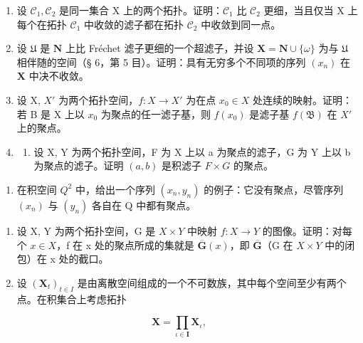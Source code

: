 \BourbakiExerciseGroup

\begin{enumerate}
\def\labelenumi{\arabic{enumi})}
\item
  设 \(\mathcal{C}_1, \mathcal{C}_2\) 是同一集合 X 上的两个拓扑。证明：\(\mathcal{C}_1\) 比 \(\mathcal{C}_2\) 更细，当且仅当 X 上每个在拓扑 \(\mathcal{C}_1\) 中收敛的滤子都在拓扑 \(\mathcal{C}_2\) 中收敛到同一点。
\item
  设 \(\mathfrak{U}\) 是 \(\mathbf{N}\) 上比 Fréchet 滤子更细的一个超滤子，并设 \(\mathbf{X} = \mathbf{N} \cup \{\omega\}\) 为与 \(\mathfrak{U}\) 相伴随的空间（§ 6，第 5 目）。证明：具有无穷多个不同项的序列 \((x_n)\) 在 \(\mathbf{X}\) 中决不收敛。
\item
  设 X, \(X'\) 为两个拓扑空间，\(f: X \to X'\) 为在点 \(x_{0} \in X\) 处连续的映射。证明：若 B 是 X 上以 \(x_{0}\) 为聚点的任一滤子基，则 \(f(x_{0})\) 是滤子基 \(f(\mathfrak{B})\) 在 \(X'\) 上的聚点。
\item
  \begin{enumerate}
  \def\labelenumii{\alph{enumii})}
  \tightlist
  \item
    设 X, Y 为两个拓扑空间，F 为 X 上以 a 为聚点的滤子，G 为 Y 上以 b 为聚点的滤子。证明 \((a, b)\) 是积滤子 \(F \times G\) 的聚点。
  \end{enumerate}
\end{enumerate}

\begin{enumerate}
\def\labelenumi{\alph{enumi})}
\setcounter{enumi}{1}
\tightlist
\item
  在积空间 \(Q^{2}\) 中，给出一个序列 \((x_{n}, y_{n})\) 的例子：它没有聚点，尽管序列 \((x_{n})\) 与 \((y_{n})\) 各自在 Q 中都有聚点。
\end{enumerate}

\begin{enumerate}
\def\labelenumi{\arabic{enumi})}
\setcounter{enumi}{4}
\item
  设 X, Y 为两个拓扑空间，G 是 \(X \times Y\) 中映射 \(f: X \to Y\) 的图像。证明：对每个 \(x \in X\)，f 在 x 处的聚点所成的集就是 \(\overline{\mathbf{G}}(x)\)，即 \(\overline{\mathbf{G}}\)（G 在 \(X \times Y\) 中的闭包）在 x 处的截口。
\item
  设 \((\mathbf{X}_t)_{t\in I}\) 是由离散空间组成的一个不可数族，其中每个空间至少有两个点。在积集合上考虑拓扑
\end{enumerate}

\[
\mathbf {X} = \prod_ {\iota \in \mathbf {I}} \mathbf {X} _ {\iota},
\]

